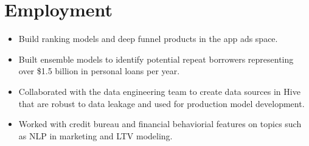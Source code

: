 \documentclass[11pt,a4paper,unicode]{moderncv}
\begin{document}
\vspace*{-6mm}
\maketitle
\vspace*{-6mm}

\section{Employment}

\vspace{-.1cm}
\cvline{}
{\begin{itemize} 
	\item Build ranking models and deep funnel products in the app ads space.
\end{itemize}}
\vspace{-.5cm}


\vspace{-.1cm}
\cvline{}
{\begin{itemize} 
	  \item Built ensemble models to identify potential repeat borrowers representing over \$1.5 billion in personal loans per year. 
	  \item Collaborated with the data engineering team to create data sources in Hive that are robust to data leakage and used for production model development.
	  \item Worked with credit bureau and financial behaviorial features on topics such as NLP in marketing and LTV modeling.
\end{itemize}}
\vspace{-.5cm}
\end{document}
